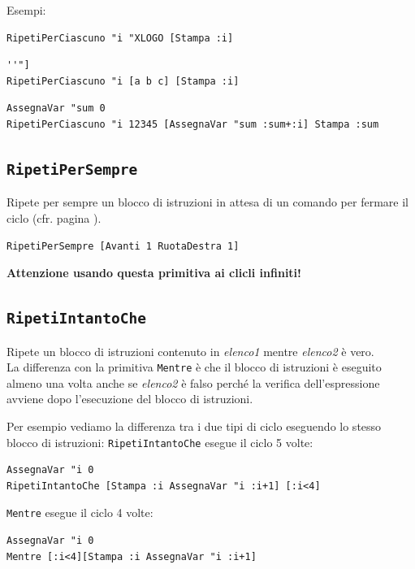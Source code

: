 Esempi:
\begin{lstlisting}[caption="Stampa i caratteri in ``XLOGO''"]
RipetiPerCiascuno "i "XLOGO [Stampa :i]
\end{lstlisting}

\begin{lstlisting}[caption="Stampa gli elementi dell'elenco ``[a b c]''"]
RipetiPerCiascuno "i [a b c] [Stampa :i]
\end{lstlisting}

\begin{lstlisting}[caption="Somma tutti i numeri da 1 a 5"]
AssegnaVar "sum 0 
RipetiPerCiascuno "i 12345 [AssegnaVar "sum :sum+:i] Stampa :sum
\end{lstlisting}


\subsection{\texttt{RipetiPerSempre}}

Ripete per sempre un blocco di istruzioni in attesa di un comando per fermare il ciclo (cfr. pagina \pageref{break}). \\
\begin{lstlisting}[caption="Un ciclo infinito"]
RipetiPerSempre [Avanti 1 RuotaDestra 1]
\end{lstlisting}

\textbf{Attenzione usando questa primitiva ai clicli infiniti!}\\


\subsection{\texttt{RipetiIntantoChe}}
\noindent 

Ripete un blocco di istruzioni contenuto in \textit{elenco1} mentre \textit{elenco2} è vero.\\
La differenza con la primitiva \texttt{Mentre} è che il blocco di istruzioni è eseguito almeno una volta anche se  \textit{elenco2} è falso perché la verifica dell'espressione avviene dopo l'esecuzione del blocco di istruzioni.

Per esempio vediamo la differenza tra i due tipi di ciclo eseguendo lo stesso blocco di istruzioni:
\texttt{RipetiIntantoChe} esegue il ciclo 5 volte:
\begin{lstlisting}[caption="Esempio di ciclo con condizione (vera) alla fine"]
AssegnaVar "i 0
RipetiIntantoChe [Stampa :i AssegnaVar "i :i+1] [:i<4]
\end{lstlisting}
\texttt{Mentre} esegue il ciclo 4 volte:
\begin{lstlisting}[caption="Esempio di ciclo con condizione all'inizio"]
AssegnaVar "i 0
Mentre [:i<4][Stampa :i AssegnaVar "i :i+1]
\end{lstlisting}



